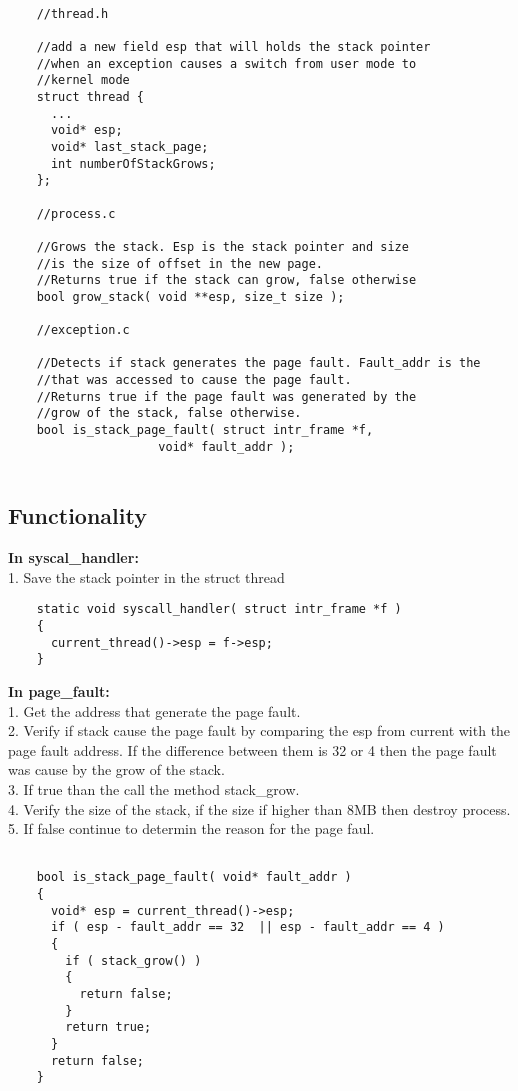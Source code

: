 \begin{lstlisting} 

	//thread.h

	//add a new field esp that will holds the stack pointer
	//when an exception causes a switch from user mode to
	//kernel mode
	struct thread {
	  ...
	  void* esp;
	  void* last_stack_page;
	  int numberOfStackGrows;
	};

	//process.c

	//Grows the stack. Esp is the stack pointer and size
	//is the size of offset in the new page.
	//Returns true if the stack can grow, false otherwise
	bool grow_stack( void **esp, size_t size );

	//exception.c

	//Detects if stack generates the page fault. Fault_addr is the 
	//that was accessed to cause the page fault.
	//Returns true if the page fault was generated by the
	//grow of the stack, false otherwise.
	bool is_stack_page_fault( struct intr_frame *f, 
					 void* fault_addr ); 
	
\end{lstlisting}


\subsection{Functionality}
 
\textbf{In syscal\_handler:}
	  \\1. Save the stack pointer in the struct thread

\begin{lstlisting}
	static void syscall_handler( struct intr_frame *f )
	{
	  current_thread()->esp = f->esp;
	}
\end{lstlisting}


\textbf{In page\_fault:}
	  \\1. Get the address that generate the page fault.
	  \\2. Verify if stack cause the page fault by comparing the esp from current with the page fault address. If the difference between them is 32 or 4 then the page fault was cause by the grow of the stack.
	  \\3. If true than the call the method stack\_grow.
	  \\4. Verify the size of the stack, if the size if higher than 8MB then destroy process.
	  \\5. If false continue to determin the reason for the page faul.

\begin{lstlisting}

	bool is_stack_page_fault( void* fault_addr )
	{
	  void* esp = current_thread()->esp;
	  if ( esp - fault_addr == 32  || esp - fault_addr == 4 )
	  {
	    if ( stack_grow() )
	    {
	      return false;
	    }
	    return true;
	  }
	  return false;
	}

\end{lstlisting}


